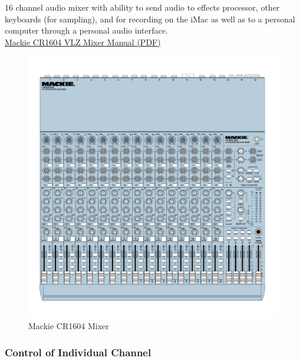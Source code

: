 16 channel audio mixer with ability to send audio to effects processor, other keyboards (for sampling), and for recording on the iMac as well as to a personal computer through a personal audio interface.\\
\linebreak
\href{https://github.com/dkadyrov/MIDILab/blob/master/Manuals/Mackie_Manual.pdf}{Mackie CR1604 VLZ Mixer Manual (PDF)}


\begin{figure}[h]
\centering
\includegraphics[width=.85\textwidth]{Images/Mackie_Manual-1.png}
\caption{Mackie CR1604 Mixer}
\end{figure}

\newpage

\subsubsection{Control of Individual Channel}


